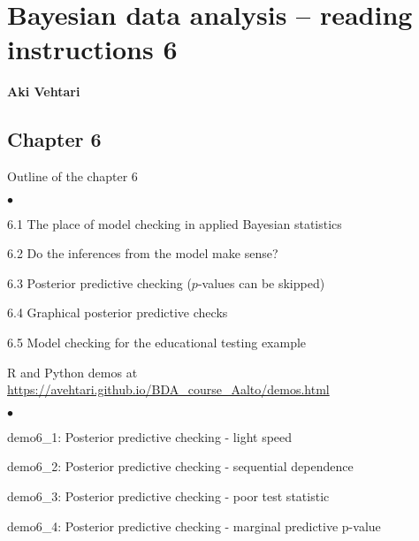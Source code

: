 \documentclass[a4paper,11pt,english]{article}
\begin{document}
\thispagestyle{empty}

\section*{Bayesian data analysis -- reading instructions 6} 
\smallskip
{\bf Aki Vehtari}
\smallskip

\subsection*{Chapter 6}

Outline of the chapter 6
\begin{list}{$\bullet$}{\parsep=0pt\itemsep=2pt}
\item 6.1 The place of model checking in applied Bayesian statistics
\item 6.2 Do the inferences from the model make sense?
\item 6.3 Posterior predictive checking {\color{gray}($p$-values can be skipped)}
\item 6.4 Graphical posterior predictive checks
\item 6.5 Model checking for the educational testing example
\end{list}

\noindent
R and Python demos at \url{https://avehtari.github.io/BDA_course_Aalto/demos.html}
\begin{list}{$\bullet$}{\parsep=0pt\itemsep=2pt}
\item demo6\_1: Posterior predictive checking - light speed
\item demo6\_2: Posterior predictive checking - sequential dependence
\item demo6\_3: Posterior predictive checking - poor test statistic
\item demo6\_4: Posterior predictive checking - marginal predictive p-value
\end{list}
\end{document}
